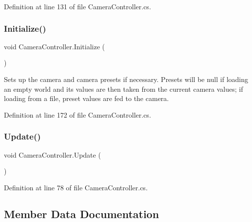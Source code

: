 Definition at line 131 of file Camera\+Controller.\+cs.

\mbox{\label{class_camera_controller_a8c7b57499a5e204821e54bd705fb3f05}} 
\subsubsection{\texorpdfstring{Initialize()}{Initialize()}}
{\footnotesize\ttfamily void Camera\+Controller.\+Initialize (\begin{DoxyParamCaption}{ }\end{DoxyParamCaption})}



Sets up the camera and camera presets if necessary. Presets will be null if loading an empty world and its values are then taken from the current camera values; if loading from a file, preset values are fed to the camera. 



Definition at line 172 of file Camera\+Controller.\+cs.

\mbox{\label{class_camera_controller_a7c4f486f4bcbd1d54a346fdce9707bd5}} 
\subsubsection{\texorpdfstring{Update()}{Update()}}
{\footnotesize\ttfamily void Camera\+Controller.\+Update (\begin{DoxyParamCaption}{ }\end{DoxyParamCaption})}



Definition at line 78 of file Camera\+Controller.\+cs.



\subsection{Member Data Documentation}
\mbox{\label{class_camera_controller_a8507cbd7f4030221961ef08e2e39a2bc}} 
